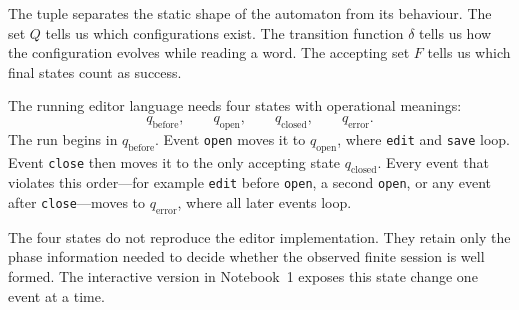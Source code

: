 \begin{definition}
\begin{center}
\vspace{10pt}
\end{center}
\end{definition}

The tuple separates the static shape of the automaton from its
behaviour.  The set $Q$ tells us which configurations exist.  The
transition function $\delta$ tells us how the configuration evolves
while reading a word.  The accepting set $F$ tells us which final states
count as success.


\begin{example}
\label{ex:editor-session-dfa}
The running editor language needs four states with operational meanings:
\[
  q_{\mathrm{before}},\qquad
  q_{\mathrm{open}},\qquad
  q_{\mathrm{closed}},\qquad
  q_{\mathrm{error}}.
\]
The run begins in \(q_{\mathrm{before}}\).  Event \texttt{open} moves it
to \(q_{\mathrm{open}}\), where \texttt{edit} and \texttt{save} loop.
Event \texttt{close} then moves it to the only accepting state
\(q_{\mathrm{closed}}\).  Every event that violates this order---for
example \texttt{edit} before \texttt{open}, a second \texttt{open}, or
any event after \texttt{close}---moves to \(q_{\mathrm{error}}\), where
all later events loop.

The four states do not reproduce the editor implementation.  They retain
only the phase information needed to decide whether the observed finite
session is well formed.  The interactive version in Notebook~1 exposes
this state change one event at a time.
\end{example}

